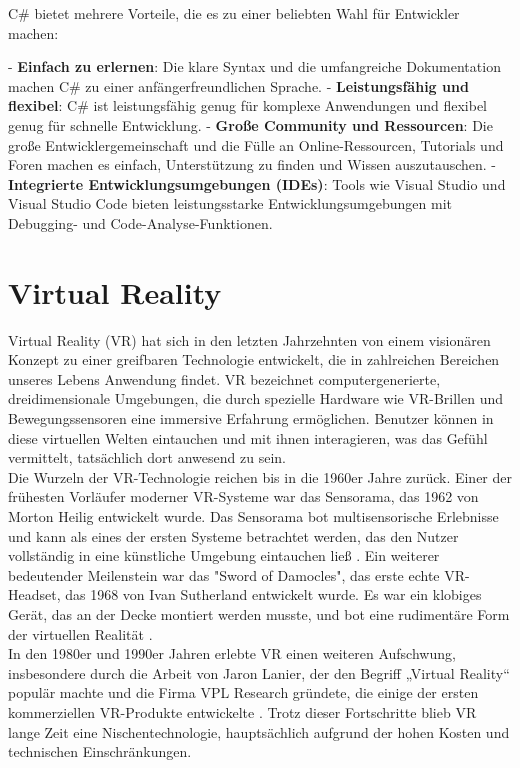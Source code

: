 C\# bietet mehrere Vorteile, die es zu einer beliebten Wahl für Entwickler machen:

- \textbf{Einfach zu erlernen}: Die klare Syntax und die umfangreiche Dokumentation machen C\# zu einer anfängerfreundlichen Sprache.
- \textbf{Leistungsfähig und flexibel}: C\# ist leistungsfähig genug für komplexe Anwendungen und flexibel genug für schnelle Entwicklung.
- \textbf{Große Community und Ressourcen}: Die große Entwicklergemeinschaft und die Fülle an Online-Ressourcen, Tutorials und Foren machen es einfach, Unterstützung zu finden und Wissen auszutauschen.
- \textbf{Integrierte Entwicklungsumgebungen (IDEs)}: Tools wie Visual Studio und Visual Studio Code bieten leistungsstarke Entwicklungsumgebungen mit Debugging- und Code-Analyse-Funktionen.
\section{Virtual Reality}
Virtual Reality (VR) hat sich in den letzten Jahrzehnten von einem visionären Konzept zu einer greifbaren Technologie entwickelt, die in zahlreichen Bereichen unseres Lebens Anwendung findet. VR bezeichnet computergenerierte, dreidimensionale Umgebungen, die durch spezielle Hardware wie VR-Brillen und Bewegungssensoren eine immersive Erfahrung ermöglichen. Benutzer können in diese virtuellen Welten eintauchen und mit ihnen interagieren, was das Gefühl vermittelt, tatsächlich dort anwesend zu sein.
\\

\noindent
Die Wurzeln der VR-Technologie reichen bis in die 1960er Jahre zurück. Einer der frühesten Vorläufer moderner VR-Systeme war das Sensorama, das 1962 von Morton Heilig entwickelt wurde. Das Sensorama bot multisensorische Erlebnisse und kann als eines der ersten Systeme betrachtet werden, das den Nutzer vollständig in eine künstliche Umgebung eintauchen ließ \cite{heilig1962}. Ein weiterer bedeutender Meilenstein war das "Sword of Damocles", das erste echte VR-Headset, das 1968 von Ivan Sutherland entwickelt wurde. Es war ein klobiges Gerät, das an der Decke montiert werden musste, und bot eine rudimentäre Form der virtuellen Realität \cite{sutherland1968}.
\\

\noindent
In den 1980er und 1990er Jahren erlebte VR einen weiteren Aufschwung, insbesondere durch die Arbeit von Jaron Lanier, der den Begriff „Virtual Reality“ populär machte und die Firma VPL Research gründete, die einige der ersten kommerziellen VR-Produkte entwickelte \cite{lanier1992}. Trotz dieser Fortschritte blieb VR lange Zeit eine Nischentechnologie, hauptsächlich aufgrund der hohen Kosten und technischen Einschränkungen.
\\

